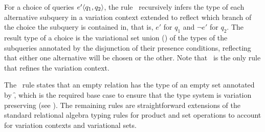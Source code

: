 For a choice of queries $\chc[e']{q_1,q_2}$, the rule \choiceE\ recursively
infers the type of each alternative subquery in a variation context extended to
reflect which branch of the choice the subquery is contained in, that is, $e'$
for $q_1$ and $\neg e'$ for $q_2$.
%
The result type of a choice is the variational set union () of the
types of the subqueries annotated by the disjunction of their presence
conditions, reflecting that either one alternative will be chosen or the other.
%
Note that \choiceE\ is the only rule that refines the variation context.


The \empRelE\ rule states that an empty relation has the type of an empty set
annotated by \f, which is the required base case to ensure that the type system
is variation preserving (see ).
%
The remaining rules are straightforward extensions of the standard relational
algebra typing rules for product and set operations to account for variation
contexts and variational sets.
%

% 
%

